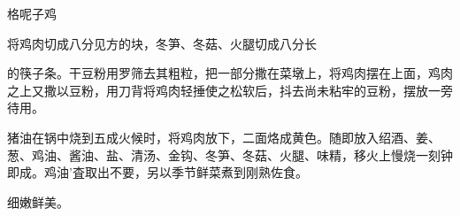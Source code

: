 \begin{recipe}{格呢子鸡}

\ingredients


\cooking

将鸡肉切成八分见方的块，冬笋、冬菇、火腿切成八分长

的筷子条。干豆粉用罗筛去其粗粒，把一部分撒在菜墩上，将鸡肉摆在上面，鸡肉之上又撒以豆粉，用刀背将鸡肉轻捶使之松软后，抖去尚未粘牢的豆粉，摆放一旁待用。

猪油在锅中烧到五成火候时，将鸡肉放下，二面烙成黄色。随即放入绍酒、姜、葱、鸡油、酱油、盐、清汤、金钩、冬笋、冬菇、火腿、味精，移火上慢烧一刻钟即成。鸡油'査取出不要，另以季节鲜菜煮到刚熟佐食。

\notes

细嫩鲜美。

\end{recipe}

